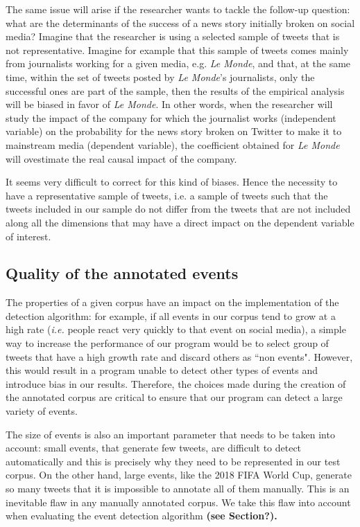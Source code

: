 The same issue will arise if the researcher wants to tackle the follow-up question: what are the determinants of the success of a news story initially broken on social media? Imagine that the researcher is using a selected sample of tweets that is not representative. Imagine for example that this sample of tweets comes mainly from journalists working for a given media, e.g. \textit{Le Monde}, and that, at the same time, within the set of tweets posted by \textit{Le Monde}’s journalists, only the successful ones are part of the sample, then the results of the empirical analysis will be biased in favor of \textit{Le Monde}. In other words, when the researcher will study the impact of the company for which the journalist works (independent variable) on the probability for the news story broken on Twitter to make it to mainstream media (dependent variable), the coefficient obtained for \textit{Le Monde} will ovestimate the real causal impact of the company.


It seems very difficult to correct for this kind of biases. Hence the necessity to have a representative sample of tweets, i.e. a sample of tweets such that the tweets included in our sample do not differ from the tweets that are not included along all the dimensions that may have a direct impact on the dependent variable of interest.

\subsection{Quality of the annotated events}

The properties of a given corpus have an impact on the implementation of the detection algorithm: for example, if all events in our corpus tend to grow at a high rate (\textit{i.e.} people react very quickly to that event on social media), a simple way to increase the performance of our program would be to select group of tweets that have a high growth rate and discard others as ``non events". However, this would result in a program unable to detect other types of events and introduce bias in our results. Therefore, the choices made during the creation of the annotated corpus are critical to ensure that our program can detect a large variety of events.

The size of events is also an important parameter that needs to be taken into account: small events, that generate few tweets, are difficult to detect automatically and this is precisely why they need to be represented in our test corpus. On the other hand, large events, like the 2018 FIFA World Cup, generate so many tweets that it is impossible to annotate all of them manually. This is an inevitable flaw in any manually annotated corpus. We take this flaw into account when evaluating the event detection algorithm  \textbf{\color{orange}(see Section?).}

